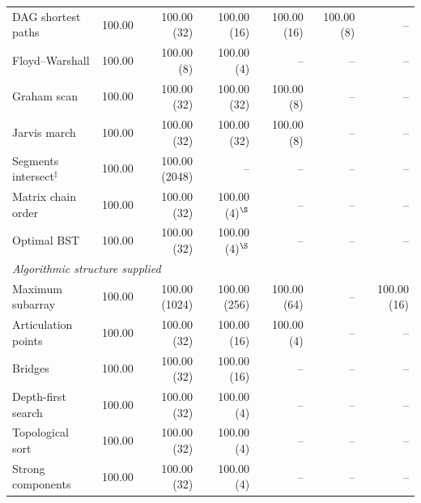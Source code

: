 \begin{tabular}{lrrrrrr}
DAG shortest paths & 100.00 & 100.00 (32) & 100.00 (16) & 100.00 (16) & 100.00 (8) & -- \\
Floyd--Warshall & 100.00 & 100.00 (8) & 100.00 (4) & -- & -- & -- \\
Graham scan & 100.00 & 100.00 (32) & 100.00 (32) & 100.00 (8) & -- & -- \\
Jarvis march & 100.00 & 100.00 (32) & 100.00 (32) & 100.00 (8) & -- & -- \\
Segments intersect$^\ddagger$ & 100.00 & 100.00 (2048) & -- & -- & -- & -- \\
Matrix chain order & 100.00 & 100.00 (32) & 100.00 (4)$^\S$ & -- & -- & -- \\
Optimal BST & 100.00 & 100.00 (32) & 100.00 (4)$^\S$ & -- & -- & -- \\
\multicolumn{7}{l}{\textit{Algorithmic structure supplied}} \\
Maximum subarray & 100.00 & 100.00 (1024) & 100.00 (256) & 100.00 (64) & -- & 100.00 (16) \\
Articulation points & 100.00 & 100.00 (32) & 100.00 (16) & 100.00 (4) & -- & -- \\
Bridges & 100.00 & 100.00 (32) & 100.00 (16) & -- & -- & -- \\
Depth-first search & 100.00 & 100.00 (32) & 100.00 (4) & -- & -- & -- \\
Topological sort & 100.00 & 100.00 (32) & 100.00 (4) & -- & -- & -- \\
Strong components & 100.00 & 100.00 (32) & 100.00 (4) & -- & -- & -- \\
\bottomrule\end{tabular}
